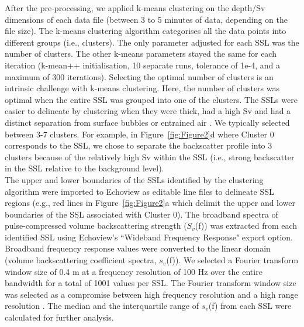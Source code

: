 

After the pre-processing, we applied k-means clustering on the depth/Sv dimensions of each data file (between 3 to 5 minutes of data, depending on the file size). The k-means clustering algorithm categorises all the data points into different groups (i.e., clusters). The only parameter adjusted for each SSL was the number of clusters. The other k-means parameters stayed the same for each iteration (k-mean++ initialisation, 10 separate runs, tolerance of 1e-4, and a maximum of 300 iterations). Selecting the optimal number of clusters is an intrinsic challenge with k-means clustering. Here, the number of clusters was optimal when the entire SSL was grouped into one of the clusters. The SSLs were easier to delineate by clustering when they were thick, had a high Sv and had a distinct separation from surface bubbles or entrained air \citep{Anderson2007}. We typically selected between 3-7 clusters. For example, in Figure~\ref{fig:Figure2}d where Cluster 0 corresponds to the SSL, we chose to separate the backscatter profile into 3 clusters because of the relatively high Sv within the SSL (i.e., strong backscatter in the SSL relative to the background level).\\
The upper and lower boundaries of the SSLs identified by the clustering algorithm were imported to Echoview as editable line files to delineate SSL regions (e.g., red lines in Figure~\ref{fig:Figure2}a which delimit the upper and lower boundaries of the SSL associated with Cluster 0). The broadband spectra of pulse-compressed volume backscattering strength ($S_{v}$(f)) was extracted from each identified SSL using Echoview's ``Wideband Frequency Response" export option. Broadband frequency response values were converted to the linear domain (volume backscattering coefficient spectra, $s_{v}$(f)). We selected a Fourier transform window size of 0.4 m at a frequency resolution of 100 Hz over the entire bandwidth for a total of 1001 values per SSL. The Fourier transform window size was selected as a compromise between high frequency resolution and a high range resolution \citep{BenoitBird2020}. The median and the interquartile range of $s_{v}$(f) from each SSL were calculated for further analysis.

